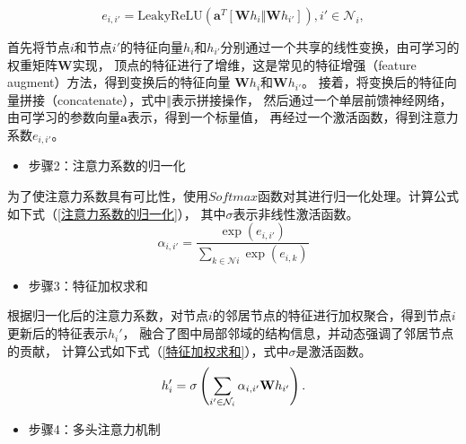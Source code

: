 \begin{equation}\label{节点重要性系数}
e_{i,i'} = \text{LeakyReLU} \left( \mathbf{a}^T \left[ \mathbf{W}h_i \Vert \mathbf{W}h_{i'} \right] \right), i' \in \mathcal{N}_i,
\end{equation}

首先将节点$i$和节点$i'$的特征向量$h_{i}$和$h_{i'}$分别通过一个共享的线性变换，由可学习的权重矩阵$\mathbf{W}$实现，
顶点的特征进行了增维，这是常见的特征增强（feature augment）方法，得到变换后的特征向量
$\mathbf{W}h_{i}$和$\mathbf{W}h_{i'}$。
接着，将变换后的特征向量拼接（concatenate），式中$\Vert$表示拼接操作，
然后通过一个单层前馈神经网络，由可学习的参数向量$\mathbf{a}$表示，得到一个标量值，
再经过一个激活函数，得到注意力系数$e_{i,i'}$。

\begin{itemize}
    \item 步骤2：注意力系数的归一化
\end{itemize}

为了使注意力系数具有可比性，使用$Softmax$函数对其进行归一化处理。计算公式如下式（\ref{注意力系数的归一化}），
其中$\sigma$表示非线性激活函数。
\begin{equation}\label{注意力系数的归一化}
\alpha_{i,i'} = \frac{\exp(e_{i,i'})}{\sum_{k \in \mathcal{N}i} \exp(e_{i,k})}
\end{equation}

\begin{itemize}
    \item 步骤3：特征加权求和
\end{itemize}

根据归一化后的注意力系数，对节点$i$的邻居节点的特征进行加权聚合，得到节点$i$更新后的特征表示$h_i'$，
融合了图中局部邻域的结构信息，并动态强调了邻居节点的贡献，
计算公式如下式（\ref{特征加权求和}），式中$\sigma$是激活函数。
\begin{equation}\label{特征加权求和}
    \\h_i' = \sigma \left( \sum_{i' \in \mathcal{N}_i} \alpha_{i,i'} \mathbf{W} h_{i'} \right).
\end{equation}

\begin{itemize}
    \item 步骤4：多头注意力机制
\end{itemize}

